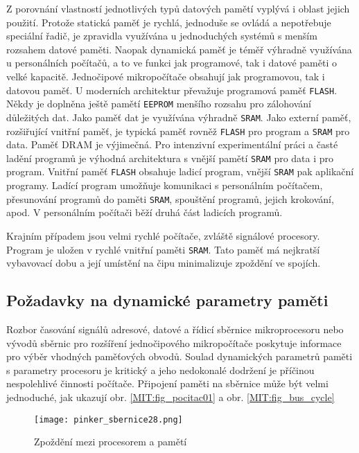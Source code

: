       Z porovnání vlastností jednotlivých typů datových pamětí vyplývá i oblast jejich použití. 
      Protože statická paměť je rychlá, jednoduše se ovládá a nepotřebuje speciální řadič, je 
      zpravidla využívána u jednoduchých systémů s menším rozsahem datové paměti. Naopak dynamická 
      paměť je téměř výhradně využívána u personálních počítačů, a to ve funkci jak programové, tak 
      i datové paměti o velké kapacitě. Jednočipové mikropočítače obsahují jak programovou, tak i 
      datovou paměť. U moderních architektur převažuje programová paměť \texttt{FLASH}. Někdy je 
      doplněna ještě pamětí \texttt{EEPROM} menšího rozsahu pro zálohování důležitých dat. Jako 
      paměť dat je využívána výhradně \texttt{SRAM}. Jako externí paměť, rozšiřující vnitřní paměť, 
      je typická paměť rovněž \texttt{FLASH} pro program a \texttt{SRAM} pro data. Paměť DRAM je 
      výjimečná. Pro intenzivní experimentální práci a časté ladění programů je výhodná 
      architektura s vnější pamětí \texttt{SRAM} pro data i pro program. Vnitřní paměť 
      \texttt{FLASH} obsahuje ladicí program, vnější \texttt{SRAM} pak aplikační programy. Ladící 
      program umožňuje komunikaci s personálním počítačem, přesunování programů do paměti 
      \texttt{SRAM}, spouštění programů, jejich krokování, apod. V personálním počítači běží druhá 
      část ladicích programů.
      
      Krajním případem jsou velmi rychlé počítače, zvláště signálové procesory. Program je uložen v 
      rychlé vnitřní paměti \texttt{SRAM}. Tato paměť má nejkratší vybavovací dobu a její umístění 
      na čipu minimalizuje zpoždění ve spojích.
      
    \subsection{Požadavky na dynamické parametry paměti}\label{MIT:chap_mem_req}
      Rozbor časování signálů adresové, datové a řídicí sběrnice mikroprocesoru nebo vývodů sběrnic 
      pro rozšíření jednočipového mikropočítače poskytuje informace pro výběr vhodných paměťových 
      obvodů. Soulad dynamických parametrů paměti s parametry procesoru je kritický a jeho 
      nedokonalé dodržení je příčinou nespolehlivé činnosti počítače. Připojení paměti na sběrnice 
      může být velmi jednoduché, jak ukazují obr. \ref{MIT:fig_pocitac01} a obr. 
      \ref{MIT:fig_bus_cycle}
           
      \begin{figure}[ht!] %
        \centering
        \texttt{[image: pinker\_sbernice28.png]}
        \caption{Zpoždění mezi procesorem a pamětí}
        \label{MIT:fig_sbernice28}
      \end{figure}
      
